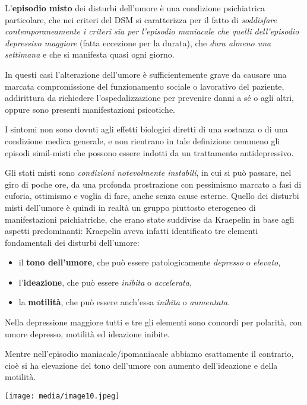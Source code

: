 \documentclass[]{article}
\begin{document}
L'\textbf{episodio misto} dei disturbi dell'umore è una condizione
psichiatrica particolare, che nei criteri del DSM si caratterizza per il
fatto di \emph{soddisfare contemporaneamente i criteri sia per
l'episodio maniacale che quelli dell'episodio depressivo maggiore}
(fatta eccezione per la durata), che \emph{dura almeno una settimana} e
che si manifesta quasi ogni giorno.

In questi casi l'alterazione dell'umore è sufficientemente grave da
causare una marcata compromissione del funzionamento sociale o
lavorativo del paziente, addirittura da richiedere l'ospedalizzazione
per prevenire danni a sé o agli altri, oppure sono presenti
manifestazioni psicotiche.

I sintomi non sono dovuti agli effetti biologici diretti di una sostanza
o di una condizione medica generale, e non rientrano in tale definizione
nemmeno gli episodi simil-misti che possono essere indotti da un
trattamento antidepressivo.

Gli stati misti sono \emph{condizioni notevolmente instabili}, in cui si
può passare, nel giro di poche ore, da una profonda prostrazione con
pessimismo marcato a fasi di euforia, ottimismo e voglia di fare, anche
senza cause esterne. Quello dei disturbi misti dell'umore è quindi in
realtà un gruppo piuttosto eterogeneo di manifestazioni psichiatriche,
che erano state suddivise da Kraepelin in base agli aspetti
predominanti: Kraepelin aveva infatti identificato tre elementi
fondamentali dei disturbi dell'umore:

\begin{itemize}
\item
  il \textbf{tono dell'umore}, che può essere patologicamente
  \emph{depresso} o \emph{elevato},
\item
  l'\textbf{ideazione}, che può essere \emph{inibita} o
  \emph{accelerata},
\item
  la \textbf{motilità}, che può essere anch'essa \emph{inibita} o
  \emph{aumentata}.
\end{itemize}

Nella depressione maggiore tutti e tre gli elementi sono concordi per
polarità, con umore depresso, motilità ed ideazione inibite.

Mentre nell'episodio maniacale/ipomaniacale abbiamo esattamente il
contrario, cioè si ha elevazione del tono dell'umore con aumento
dell'ideazione e della motilità.

\texttt{[image: media/image10.jpeg]}
\end{document}
